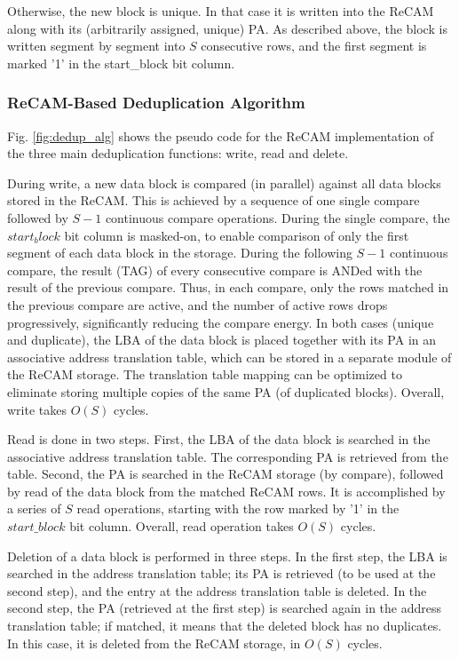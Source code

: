 \documentclass{superfri}
\begin{document}
	
	Otherwise, the new block is unique. In that case it is written into the ReCAM along with its (arbitrarily assigned, unique) PA. As described above, the block is written segment by segment into $S$ consecutive rows, and the first segment is marked '1' in the start\_block bit column. 
	
	\subsubsection{ReCAM-Based Deduplication Algorithm}
	
	Fig. \ref{fig:dedup_alg} shows the pseudo code for the ReCAM implementation of the three main deduplication functions: write, read and delete.
	
	During write, a new data block is compared (in parallel) against all data blocks stored in the ReCAM. This is achieved by a sequence of one single compare followed by $S-1$ continuous compare operations. During the single compare, the $start_block$ bit column is masked-on, to enable comparison of only the first segment of each data block in the storage. During the following $S-1$ continuous compare, the result (TAG) of every consecutive compare is ANDed with the result of the previous compare. Thus, in each compare, only the rows matched in the previous compare are active, and the number of active rows drops progressively, significantly reducing the compare energy. In both cases (unique and duplicate), the LBA of the data block is placed together with its PA in an associative address translation table, which can be stored in a separate module of the ReCAM storage. The translation table mapping can be optimized to eliminate storing multiple copies of the same PA (of duplicated blocks). Overall, write takes $O(S)$ cycles.  
	
	Read is done in two steps. First, the LBA of the data block is searched in the associative address translation table. The corresponding PA is retrieved from the table. Second, the PA is searched in the ReCAM storage (by compare), followed by read of the data block from the matched ReCAM rows. It is accomplished by a series of $S$ read operations, starting with the row marked by '1' in the $start\_block$ bit column. Overall, read operation takes $O(S)$ cycles.  
	
	Deletion of a data block is performed in three steps. In the first step, the LBA is searched in the address translation table; its PA is retrieved (to be used at the second step), and the entry at the address translation table is deleted. In the second step, the PA (retrieved at the first step) is searched again in the address translation table; if matched, it means that the deleted block has no duplicates. In this case, it is deleted from the ReCAM storage, in $O(S)$ cycles.
	
\end{document}
